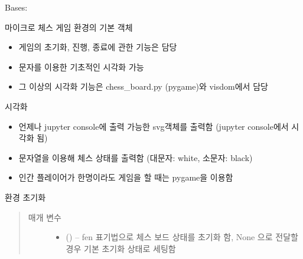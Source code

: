 \documentclass[letterpaper,10pt,english]{sphinxmanual}
\begin{document}
\begin{fulllineitems}
\label{\detokenize{scripts:scripts.run_game.Environment}}
Bases: 

마이크로 체스 게임 환경의 기본 객체
\begin{itemize}
\item {} 
게임의 초기화, 진행, 종료에 관한 기능은 담당

\item {} 
문자를 이용한 기초적인 시각화 가능

\item {} 
그 이상의 시각화 기능은 chess\_board.py (pygame)와 visdom에서 담당

\end{itemize}

\begin{fulllineitems}
\label{\detokenize{scripts:scripts.run_game.Environment.close}}
\end{fulllineitems}


\begin{fulllineitems}
\label{\detokenize{scripts:scripts.run_game.Environment.render}}
시각화
\begin{itemize}
\item {} 
언제나 jupyter console에 출력 가능한 svg객체를 출력함 (jupyter console에서 시각화 됨)

\item {} 
문자열을 이용해 체스 상태를 출력함 (대문자: white, 소문자: black)

\item {} 
인간 플레이어가 한명이라도 게임을 할 때는 pygame을 이용함

\end{itemize}

\end{fulllineitems}


\begin{fulllineitems}
\label{\detokenize{scripts:scripts.run_game.Environment.reset}}
환경 초기화
\begin{quote}\begin{description}
\item[{매개 변수}] \leavevmode\begin{itemize}
\item {} 
 () -- fen 표기법으로 체스 보드 상태를 초기화 함, None 으로 전달할 경우 기본 초기화 상태로 세팅함


\end{itemize}
\end{description}
\end{quote}
\end{fulllineitems}
\end{fulllineitems}
\end{document}
